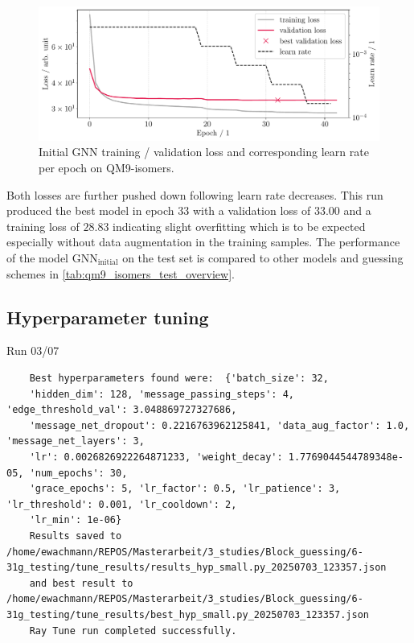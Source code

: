 \begin{figure}[H]
    \centering
    \includegraphics[width=\textwidth]{../fig/gnn/MGNN_6-31G_NO_AUG_07_07_manual_ref_train_val_loss.pdf}
    \caption[Initial GNN loss on QM9-isomers]{Initial GNN training / validation loss and corresponding learn rate per epoch on QM9-isomers.}
    \label{fig:initial_train_qm9_isomers}
\end{figure}
Both losses are further pushed down following learn rate decreases. This run produced the best model in epoch 33 with a validation loss of $33.00$ and a training loss of $28.83$ indicating slight overfitting which is to be expected especially without data augmentation in the training samples. The performance of the model $\text{GNN}_\text{initial}$ on the test set is compared to other models and guessing schemes in \autoref{tab:qm9_isomers_test_overview}. 


\subsection{Hyperparameter tuning}
\label{subsec:qm9_isomers_hyperparamtuning}



Run 03/07
\begin{verbatim}
    Best hyperparameters found were:  {'batch_size': 32, 
    'hidden_dim': 128, 'message_passing_steps': 4, 'edge_threshold_val': 3.048869727327686, 
    'message_net_dropout': 0.2216763962125841, 'data_aug_factor': 1.0, 'message_net_layers': 3, 
    'lr': 0.0026826922264871233, 'weight_decay': 1.7769044544789348e-05, 'num_epochs': 30, 
    'grace_epochs': 5, 'lr_factor': 0.5, 'lr_patience': 3, 'lr_threshold': 0.001, 'lr_cooldown': 2, 
    'lr_min': 1e-06}
    Results saved to /home/ewachmann/REPOS/Masterarbeit/3_studies/Block_guessing/6-31g_testing/tune_results/results_hyp_small.py_20250703_123357.json 
    and best result to /home/ewachmann/REPOS/Masterarbeit/3_studies/Block_guessing/6-31g_testing/tune_results/best_hyp_small.py_20250703_123357.json
    Ray Tune run completed successfully.
\end{verbatim}


